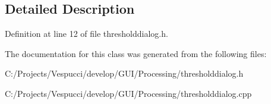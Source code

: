 \subsection{Detailed Description}


Definition at line 12 of file thresholddialog.\+h.



The documentation for this class was generated from the following files\+:\begin{DoxyCompactItemize}
\item 
C\+:/\+Projects/\+Vespucci/develop/\+G\+U\+I/\+Processing/thresholddialog.\+h\item 
C\+:/\+Projects/\+Vespucci/develop/\+G\+U\+I/\+Processing/thresholddialog.\+cpp\end{DoxyCompactItemize}
